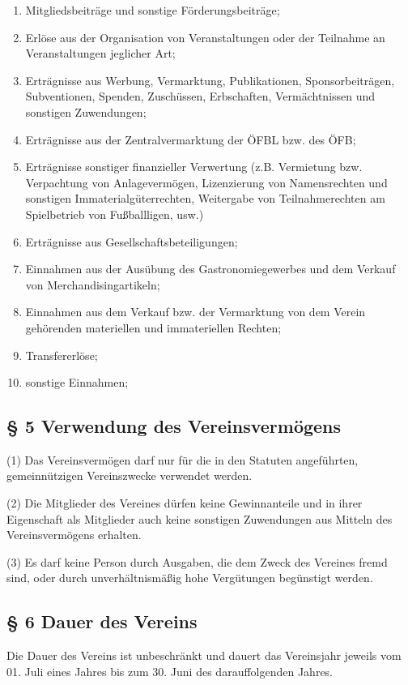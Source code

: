 \documentclass[11pt,a4paper]{article}
\begin{document}
\begin{enumerate}[label=\alph*)]
\item
Mitgliedsbeiträge und sonstige Förderungsbeiträge;
\item
Erlöse aus der Organisation von Veranstaltungen oder der Teilnahme an Veranstaltungen jeglicher Art;
\item
Erträgnisse aus Werbung, Vermarktung, Publikationen, Sponsorbeiträgen, Subventionen, Spenden, Zuschüssen, Erbschaften, Vermächtnissen und sonstigen Zuwendungen;
\item
Erträgnisse aus der Zentralvermarktung der ÖFBL bzw. des ÖFB;
\item
Erträgnisse sonstiger finanzieller Verwertung (z.B. Vermietung bzw. Verpachtung von Anlagevermögen, Lizenzierung von Namensrechten und sonstigen Immaterialgüterrechten, Weitergabe von Teilnahmerechten am Spielbetrieb von Fußballligen, usw.)
\item
Erträgnisse aus Gesellschaftsbeteiligungen;
\item
Einnahmen aus der Ausübung des Gastronomiegewerbes und dem Verkauf von Merchandisingartikeln;
\item
Einnahmen aus dem Verkauf bzw. der Vermarktung von dem Verein gehörenden materiellen und immateriellen Rechten;
\item
Transfererlöse;
\item
sonstige Einnahmen;
\end{enumerate}

\subsection{§ 5
Verwendung des Vereinsvermögens}

(1)
Das Vereinsvermögen darf nur für die in den Statuten angeführten, gemeinnützigen Vereinszwecke verwendet werden.

(2)
Die Mitglieder des Vereines dürfen keine Gewinnanteile und in ihrer Eigenschaft als Mitglieder auch keine sonstigen Zuwendungen aus Mitteln des Vereinsvermögens erhalten.

(3)
Es darf keine Person durch Ausgaben, die dem Zweck des Vereines fremd sind, oder durch unverhältnismäßig hohe Vergütungen begünstigt werden.

\subsection{§ 6
Dauer des Vereins}

Die Dauer des Vereins ist unbeschränkt und dauert das Vereinsjahr jeweils vom 01. Juli eines Jahres bis zum 30. Juni des darauffolgenden Jahres.
\end{document}
